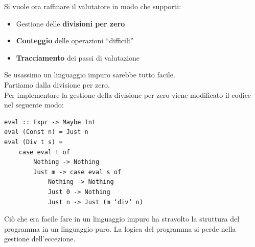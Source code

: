 \documentclass{article}
\begin{document}
Si vuole ora raffinare il valutatore in modo che supporti:
\begin{itemize}
    \item Gestione delle \textbf{divisioni per zero}
    \item \textbf{Conteggio} delle operazioni “difficili”
    \item \textbf{Tracciamento} dei passi di valutazione
\end{itemize}
Se usassimo un linguaggio impuro sarebbe tutto facile.\vspace{14pt}\\
Partiamo dalla divisione per zero.\\
Per implementare la gestione della divisione per zero viene modificato il codice nel seguente modo:
\begin{tcolorbox}
\begin{verbatim}
eval :: Expr -> Maybe Int
eval (Const n) = Just n
eval (Div t s) =
    case eval t of
        Nothing -> Nothing
        Just m -> case eval s of
            Nothing -> Nothing
            Just 0 -> Nothing
            Just n -> Just (m ‘div‘ n)
\end{verbatim}
\end{tcolorbox}
Ciò che era facile fare in un linguaggio impuro ha stravolto la struttura del programma in un linguaggio puro. La logica del programma si perde nella gestione dell’eccezione.

\pagebreak
\end{document}
